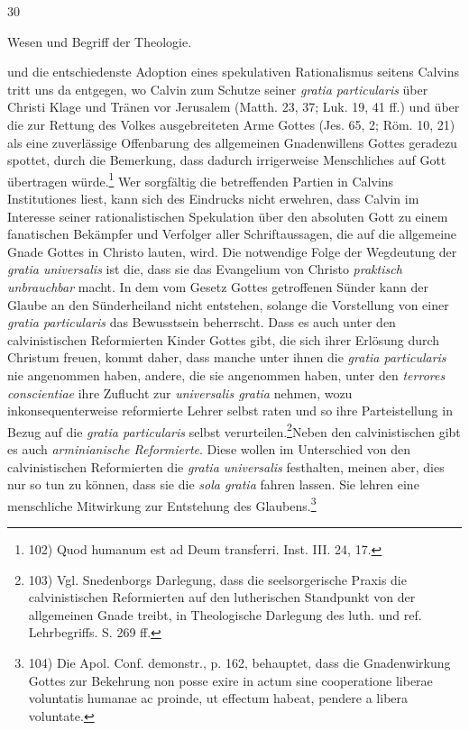 30\par\begin{center}Wesen und Begriff der Theologie.\end{center}und die entschiedenste Adoption eines spekulativen Rationalismus seitens Calvins tritt uns da entgegen, wo Calvin zum Schutze seiner \emph{gratia particularis} über Christi Klage und Tränen vor Jerusalem (Matth. 23, 37; Luk. 19, 41 ff.) und über die zur Rettung des Volkes ausgebreiteten Arme Gottes (Jes. 65, 2; Röm. 10, 21) als eine zuverlässige Offenbarung des allgemeinen Gnadenwillens Gottes geradezu spottet, durch die Bemerkung, dass dadurch irrigerweise Menschliches auf Gott übertragen würde.\footnote{102) Quod humanum est ad Deum transferri. Inst. III. 24, 17.} Wer sorgfältig die betreffenden Partien in Calvins Institutiones liest, kann sich des Eindrucks nicht erwehren, dass Calvin im Interesse seiner rationalistischen Spekulation über den absoluten Gott zu einem fanatischen Bekämpfer und Verfolger aller Schriftaussagen, die auf die allgemeine Gnade Gottes in Christo lauten, wird. Die notwendige Folge der Wegdeutung der \emph{gratia universalis} ist die, dass sie das Evangelium von Christo \emph{praktisch unbrauchbar} macht. In dem vom Gesetz Gottes getroffenen Sünder kann der Glaube an den Sünderheiland nicht entstehen, solange die Vorstellung von einer \emph{gratia particularis} das Bewusstsein beherrscht. Dass es auch unter den calvinistischen Reformierten Kinder Gottes gibt, die sich ihrer Erlösung durch Christum freuen, kommt daher, dass manche unter ihnen die \emph{gratia particularis} nie angenommen haben, andere, die sie angenommen haben, unter den \emph{terrores conscientiae} ihre Zuflucht zur \emph{universalis gratia} nehmen, wozu inkonsequenterweise reformierte Lehrer selbst raten und so ihre Parteistellung in Bezug auf die \emph{gratia particularis} selbst verurteilen.\footnote{103) Vgl. Snedenborgs Darlegung, dass die seelsorgerische Praxis die calvinistischen Reformierten auf den lutherischen Standpunkt von der allgemeinen Gnade treibt, in Theologische Darlegung des luth. und ref. Lehrbegriffs. S. 269 ff.}Neben den calvinistischen gibt es auch \emph{arminianische Reformierte}. Diese wollen im Unterschied von den calvinistischen Reformierten die \emph{gratia universalis} festhalten, meinen aber, dies nur so tun zu können, dass sie die \emph{sola gratia} fahren lassen. Sie lehren eine menschliche Mitwirkung zur Entstehung des Glaubens.\footnote{104) Die Apol. Conf. demonstr., p. 162, behauptet, dass die Gnadenwirkung Gottes zur Bekehrung non posse exire in actum sine cooperatione liberae voluntatis humanae ac proinde, ut effectum habeat, pendere a libera voluntate.}